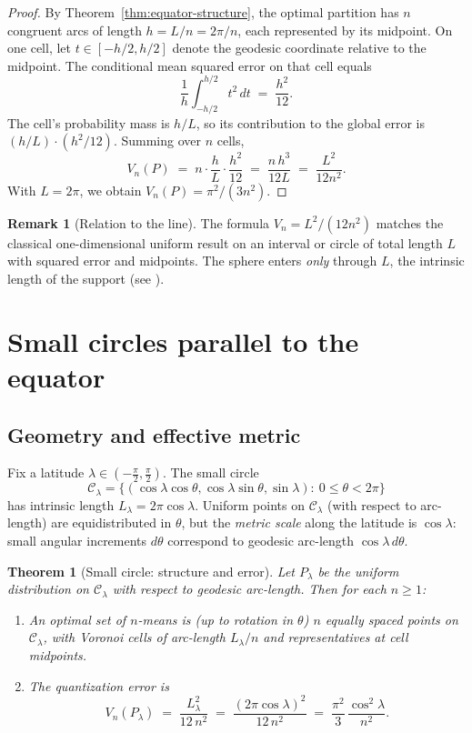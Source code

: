 \documentclass[12pt, reqno]{amsart}
\theoremstyle{plain}
\newtheorem{theorem1}[subsubsection]{Theorem}
\theoremstyle{definition}
\newtheorem{remark1}[subsubsection]{Remark}
\newcommand{\gq}{\theta}
\begin{document}
\begin{proof}
By Theorem~\ref{thm:equator-structure}, the optimal partition has $n$ congruent arcs of length $h=L/n=2\pi/n$, each represented by its midpoint. On one cell, let $t\in[-h/2,h/2]$ denote the geodesic coordinate relative to the midpoint. The conditional mean squared error on that cell equals
\[
\frac{1}{h}\int_{-h/2}^{h/2} t^2\,dt \;=\; \frac{h^2}{12}.
\]
The cell's probability mass is $h/L$, so its contribution to the global error is $(h/L)\cdot (h^2/12)$. Summing over $n$ cells,
\[
V_n(P) \;=\; n\cdot \frac{h}{L}\cdot \frac{h^2}{12} \;=\; \frac{n\,h^3}{12L}\;=\;\frac{L^2}{12n^2}.
\]
With $L=2\pi$, we obtain $V_n(P)=\pi^2/(3n^2)$.
\end{proof}

\begin{remark1}[Relation to the line]
The formula $V_n=L^2/(12n^2)$ matches the classical one-dimensional uniform result on an interval or circle of total length $L$ with squared error and midpoints. The sphere enters \emph{only} through $L$, the intrinsic length of the support (see \cite{RosenblattRoychowdhury2023}).
\end{remark1}

\section{Small circles parallel to the equator}

\subsection{Geometry and effective metric}
Fix a latitude $\lambda\in(-\frac{\pi}{2},\frac{\pi}{2})$. The small circle
\[
\mathcal{C}_\lambda=\{(\cos\lambda\cos\gq,\cos\lambda\sin\gq,\sin\lambda):\ 0\le \gq<2\pi\}
\]
has intrinsic length $L_\lambda=2\pi\cos\lambda$. Uniform points on $\mathcal{C}_\lambda$ (with respect to arc-length) are equidistributed in $\gq$, but the \emph{metric scale} along the latitude is $\cos\lambda$: small angular increments $d\gq$ correspond to geodesic arc-length $\cos\lambda\, d\gq$.

\begin{theorem1}[Small circle: structure and error]\label{thm:small-circle}
Let $P_\lambda$ be the uniform distribution on $\mathcal{C}_\lambda$ with respect to geodesic arc-length. Then for each $n\ge 1$:
\begin{enumerate}[label=(\roman*), leftmargin=1.5em]
  \item An optimal set of $n$-means is (up to rotation in $\gq$) $n$ equally spaced points on $\mathcal{C}_\lambda$, with Voronoi cells of arc-length $L_\lambda/n$ and representatives at cell midpoints.
  \item The quantization error is
  \[
  V_n(P_\lambda)\;=\;\frac{L_\lambda^2}{12\,n^2}\;=\;\frac{(2\pi\cos\lambda)^2}{12\,n^2}\;=\;\frac{\pi^2}{3}\,\frac{\cos^2\lambda}{n^2}.
  \]
\end{enumerate}
\end{theorem1}
\end{document}

